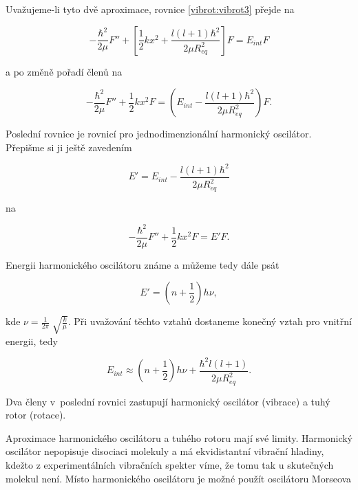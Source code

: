 Uvažujeme-li tyto dvě aproximace, rovnice \ref{vibrot:vibrot3} přejde na 

\begin{equation}
-\frac{\hbar^2}{2\mu}F''+\left[\frac{1}{2}kx^2+\frac{l\left(l+1\right)\hbar^2}{2\mu R_{eq}^2}\right]F=E_{int}F 
\label{vibrot:vibrot4}
\end{equation}

\noindent a po změně pořadí členů na 

\begin{equation}
-\frac{\hbar^2}{2\mu}F''+\frac{1}{2}kx^2F=\left(E_{int}-\frac{l\left(l+1\right)\hbar^2}{2\mu R_{eq}^2}\right)F. 
\label{vibrot:vibrot5}
\end{equation}

\noindent Poslední rovnice je rovnicí pro jednodimenzionální harmonický oscilátor. Přepišme si ji ještě zavedením

\begin{displaymath}
E'=E_{int}-\frac{l\left(l+1\right)\hbar^2}{2\mu R_{eq}^2}
\end{displaymath}

\noindent na

\begin{equation}
-\frac{\hbar^2}{2\mu}F''+\frac{1}{2}kx^2F=E'F. 
\label{vibrot:vibrot6}
\end{equation}

Energii harmonického oscilátoru známe a můžeme tedy dále psát

\begin{equation}
E'=\left(n+\frac{1}{2}\right)h\nu,
\end{equation}

\noindent kde $\nu=\frac{1}{2\pi}\sqrt[]{\frac{k}{\mu}}$. Při uvažování těchto vztahů dostaneme konečný vztah pro vnitřní energii, tedy

\begin{equation}
\boxed{E_{int}\approx \left(n+\frac{1}{2}\right) h\nu+\frac{\hbar^2l(l+1)}{2\mu R_{eq}^2}.}
\end{equation}

\noindent Dva členy v~poslední rovnici zastupují harmonický oscilátor (vibrace) a tuhý rotor (rotace). 

\noindent Aproximace harmonického oscilátoru a tuhého rotoru mají své limity. Harmonický oscilátor nepopisuje disociaci molekuly a má ekvidistantní vibrační hladiny, kdežto z experimentálních vibračních spekter víme, že tomu tak u skutečných molekul není. Místo harmonického oscilátoru je možné použít oscilátoru Morseova


